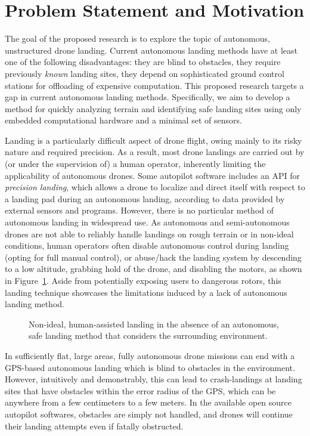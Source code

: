 \section{Problem Statement and Motivation}

The goal of the proposed research is to explore the topic of
autonomous, unstructured drone landing.
Current autonomous landing methods have at least one of the following disadvantages:
they are blind to obstacles,
they require previously \textit{known} landing sites,
they depend on sophisticated ground control stations for offloading of expensive computation.
This proposed research targets a gap in current autonomous landing methods.
Specifically, we aim to develop a method for quickly analyzing terrain
and identifying safe landing sites using only embedded computational hardware
and a minimal set of sensors.

Landing is a particularly difficult aspect of drone flight,
owing mainly to its risky nature and required precision.
As a result, most drone landings are carried out by
(or under the supervision of)
a human operator,
inherently limiting the applicability of autonomous drones.
Some autopilot software includes an \gls{API} for \textit{precision landing},
which allows a drone to localize and direct itself with respect to a landing pad during an autonomous landing,
according to data provided by external sensors and programs.
However, there is no particular method of autonomous landing in widespread use.
As autonomous and semi-autonomous drones are not able to reliably handle landings
on rough terrain or in non-ideal conditions, human operators often disable
autonomous control during landing (opting for full manual control),
or abuse/hack the landing system by descending to a low altitude,
grabbing hold of the drone,
and disabling the motors,
as shown in Figure~\ref{figure:hand_landing}.
Aside from potentially exposing users to dangerous rotors,
this landing technique showcases the limitations induced by a lack of
autonomous landing method.

\begin{figure}[ht]
    \centering
    \begin{minipage}{\wd0}
      \caption{Non-ideal, human-assisted landing in the absence of an autonomous, safe landing method that considers the surrounding environment.}
      \label{figure:hand_landing}
    \end{minipage}
\end{figure}

In sufficiently flat, large areas, fully autonomous drone missions can end with a GPS-based
autonomous landing which is blind to obstacles in the environment.
However,
intuitively and demonstrably,
this can lead to crash-landings at landing sites that have obstacles within
the error radius of the GPS,
which can be anywhere from a few centimeters to a few meters.
In the available open source autopilot softwares,
obstacles are simply not handled,
and drones will continue their landing attempts even if fatally obstructed.